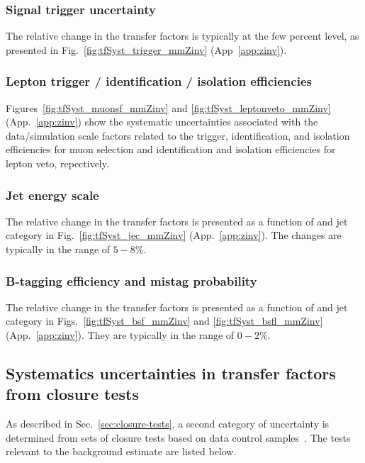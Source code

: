 \subsubsection{Signal trigger uncertainty}
\label{sec:tfSyst_trigger-zinv}

The relative change in the transfer factors is typically at the few
percent level, as presented in Fig.~\ref{fig:tfSyst_trigger_mmZinv}
(App~\ref{app:zinv}).

\subsubsection{Lepton trigger / identification / isolation efficiencies}
\label{sec:leptonSyst-zinv}

Figures~\ref{fig:tfSyst_muonsf_mmZinv} and
\ref{fig:tfSyst_leptonveto_mmZinv} (App.~\ref{app:zinv}) show the
systematic uncertainties associated with the data/simulation scale
factors related to the trigger, identification, and isolation
efficiencies for muon selection and identification and isolation
efficiencies for lepton veto, repectively.

\subsubsection{Jet energy scale}
\label{sec:tfSyst_jec-zinv}

The relative change in the transfer factors is presented as a function
of \scalht and jet category in Fig.~\ref{fig:tfSyst_jec_mmZinv}
(App.~\ref{app:zinv}). The changes are typically in the range of
$5-8\%$.

\subsubsection{B-tagging efficiency and mistag probability}
\label{sec:tfSyst_btag-zinv}

The relative change in the transfer factors is presented as a function
of \scalht and jet category in Figs.~\ref{fig:tfSyst_bsf_mmZinv} and
\ref{fig:tfSyst_bsfl_mmZinv} (App.~\ref{app:zinv}).  They are
typically in the range of $0-2\%$.

\subsection{Systematics uncertainties in transfer factors from closure tests}
\label{sec:closure-tests-zinv}

As described in Sec.~\ref{sec:closure-tests}, a second category of
uncertainty is determined from sets of closure tests based on data
control samples~\cite{RA1Paper2012}. The tests relevant to the \znunuj
background estimate are listed below. 

